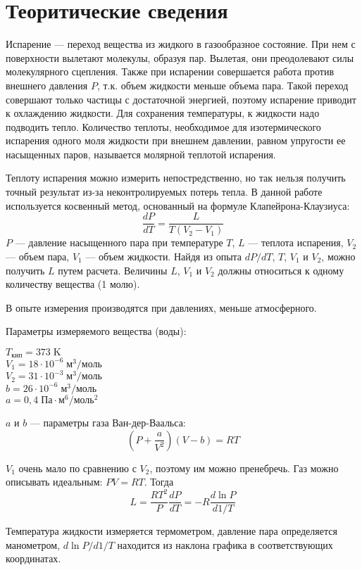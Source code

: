 \section{Теоритические сведения}
Испарение --- переход вещества из жидкого в газообразное состояние. При нем с поверхности
вылетают молекулы, образуя пар. Вылетая, они преодолевают силы молекулярного сцепления. Также
при испарении совершается работа против внешнего давления $P$, т.к. объем жидкости меньше объема пара.
Такой переход совершают только частицы с достаточной энергией, поэтому испарение приводит к охлаждению
жидкости. Для сохранения температуры, к жидкости надо подводить тепло. Количество теплоты,
необходимое для изотермического испарения одного моля жидкости при внешнем давлении, равном
упругости ее насыщенных паров, называется молярной теплотой испарения.

Теплоту испарения можно измерить непостредственно, но так нельзя получить точный результат
из-за неконтролируемых потерь тепла. В данной работе используется косвенный метод,
основанный на формуле Клапейрона-Клаузиуса:
\[\frac{dP}{dT}=\frac{L}{T\left(V_2-V_1\right)}\]
$P$ --- давление насыщенного пара при температуре $T$, $L$ --- теплота испарения,
$V_2$ --- объем пара, $V_1$ --- объем жидкости. Найдя из опыта $dP/dT$, $T$, $V_1$ и $V_2$,
можно получить $L$ путем расчета. Величины $L$, $V_1$ и $V_2$ должны относиться к одному
количеству вещества (1 молю).

В опыте измерения производятся при давлениях, меньше атмосферного. 

Параметры измеряемого вещества (воды):
\begin{center}
    $T_\text{кип}=373\;\text{K}$\\
    $V_1 = 18\cdot 10^{-6}\;\text{м}^3/\text{моль}$\\
    $V_2 = 31\cdot 10^{-3}\;\text{м}^3/\text{моль}$\\
    $b = 26\cdot 10^{-6}\;\text{м}^3/\text{моль}$\\
    $a = 0{,}4\;\text{Па}\cdot\text{м}^6/\text{моль}^2$\\
\end{center}
$a$ и $b$ --- параметры газа Ван-дер-Ваальса:
\[\left(P+\frac{a}{V^2}\right)\left(V-b\right)=RT\]

$V_1$ очень мало по сравнению с $V_2$, поэтому им можно пренебречь.
Газ можно описывать идеальным: $PV=RT$.
Тогда
\[L=\frac{RT^2}{P}\frac{dP}{dT}=-R\frac{d\ln P}{d 1/T}\]

Температура жидкости измеряется термометром, давление пара определяется манометром,
$d\ln P/d1/T$ находится из наклона графика в соответствующих координатах.

